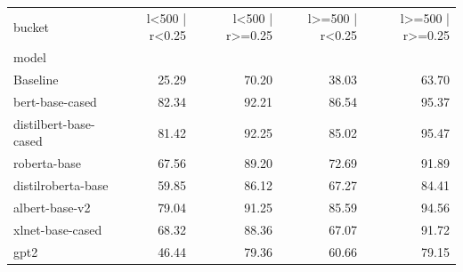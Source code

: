\begin{tabular}{lrrrr}
\toprule
bucket & l<500 | r<0.25 & l<500 | r>=0.25 & l>=500 | r<0.25 & l>=500 | r>=0.25 \\
model &  &  &  &  \\
\midrule
Baseline & 25.29 & 70.20 & 38.03 & 63.70 \\
bert-base-cased & 82.34 & 92.21 & 86.54 & 95.37 \\
distilbert-base-cased & 81.42 & 92.25 & 85.02 & 95.47 \\
roberta-base & 67.56 & 89.20 & 72.69 & 91.89 \\
distilroberta-base & 59.85 & 86.12 & 67.27 & 84.41 \\
albert-base-v2 & 79.04 & 91.25 & 85.59 & 94.56 \\
xlnet-base-cased & 68.32 & 88.36 & 67.07 & 91.72 \\
gpt2 & 46.44 & 79.36 & 60.66 & 79.15 \\
\bottomrule
\end{tabular}
